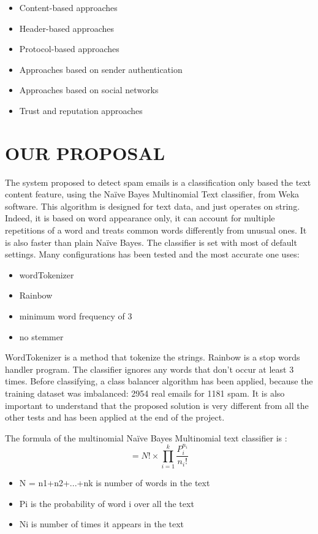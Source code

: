\documentclass[runningheads]{llncs}
\begin{document}
%
\begin{itemize}
    \item Content-based approaches
    \item Header-based approaches
    \item Protocol-based approaches
    \item Approaches based on sender authentication
    \item Approaches based on social networks
    \item Trust and reputation approaches
\end{itemize}
%
%
%
\section{OUR PROPOSAL}
%
The system proposed to detect spam emails is a classification only based the text content feature, using the Naïve Bayes Multinomial Text classifier, from Weka software. This algorithm is designed for text data, and just operates on string. Indeed, it is based on word appearance only, it can account for multiple repetitions of a word and treats common words differently from unusual ones. It is also faster than plain Naïve Bayes. The classifier is set with most of default settings. Many configurations has been tested and the most accurate one uses:
%
\begin{itemize}
    \item wordTokenizer 
    \item Rainbow
    \item minimum word frequency of 3
    \item no stemmer
\end{itemize}
%
WordTokenizer is a method that tokenize the strings. Rainbow is a stop words handler program. The classifier ignores any words that don't occur at least 3 times. Before classifying, a class balancer algorithm has been applied, because the training dataset was imbalanced: 2954 real emails for 1181 spam. It is also important to understand that the proposed solution is very different from all the other tests and has been applied at the end of the project. \\\par
\noindent The formula of the multinomial Naïve Bayes Multinomial text classifier is :
\begin{equation}
= N! \times \prod_{i=1}^{k}\frac{P_{i}^{n_{i}}}{n_{i}!}
\end{equation}
\begin{itemize}
    \item N = n1+n2+...+nk is number of words in the text
    \item Pi is the probability of word i over all the text
    \item Ni is number of times it appears in the text
\end{itemize}
%
%
%
\end{document}

